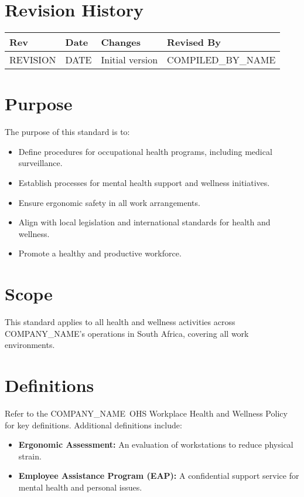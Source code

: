 \documentclass[11pt]{article}
\newcommand{\issueDate}{{{DATE}}}
\newcommand{\clientName}{{{COMPANY_NAME}}}
\newcommand{\compilerName}{{{COMPILED_BY_NAME}}}
\newcommand{\revision}{{{REVISION}}}
\begin{document}
\section{Revision History}
\begin{tabularx}{\textwidth}{lXll}
  \toprule
  \textbf{Rev} & \textbf{Date} & \textbf{Changes} & \textbf{Revised By} \\
  \midrule
  \revision & \issueDate & Initial version & \compilerName \\
  \bottomrule
\end{tabularx}

\section{Purpose}
The purpose of this standard is to:
\begin{itemize}
    \item Define procedures for occupational health programs, including medical surveillance.
    \item Establish processes for mental health support and wellness initiatives.
    \item Ensure ergonomic safety in all work arrangements.
    \item Align with local legislation and international standards for health and wellness.
    \item Promote a healthy and productive workforce.
\end{itemize}

\section{Scope}
This standard applies to all health and wellness activities across \clientName’s operations in South Africa, covering all work environments.

\section{Definitions}
Refer to the \clientName\ OHS Workplace Health and Wellness Policy for key definitions. Additional definitions include:
\begin{itemize}
    \item \textbf{Ergonomic Assessment:} An evaluation of workstations to reduce physical strain.
    \item \textbf{Employee Assistance Program (EAP):} A confidential support service for mental health and personal issues.
\end{itemize}
\end{document}
